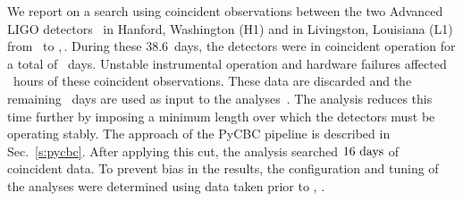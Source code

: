We report on a search using coincident observations between the two Advanced
LIGO detectors~\cite{TheLIGOScientific:2014jea} in Hanford, Washington (H1) and in
Livingston, Louisiana (L1) from \OBSSTART\ to \OBSEND,\,\OBSYEAR. During these
$38.6$~days, the detectors were in coincident operation for a total of
\TotalAvailableCoincTime~days. Unstable instrumental operation and hardware
failures affected \CatOneVetoTime~hours of these coincident observations.
These data are discarded and the remaining \TotalCoincAfterCATOne~days are
used as input to the analyses~\cite{GW150914-DETCHAR}.  The \pycbc{} analysis reduces
this time further by imposing a minimum length over which the detectors must
be operating stably. The approach of the PyCBC pipeline is described
in Sec.~\ref{s:pycbc}.  After applying this cut, the \pycbc{} analysis
searched $16~\mathrm{days}$ of coincident data. To prevent bias in
the results, the configuration and tuning of the analyses were determined
using data taken prior to \OBSSTART, \OBSYEAR.

